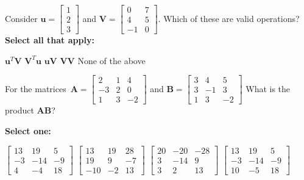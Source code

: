 \documentclass[11pt,addpoints,answers]{exam}
\numberwithin{equation}{section} %
\numberwithin{figure}{section} %
\numberwithin{table}{section} %
\newcommand{\uv}{\mathbf{u}}
\newcommand{\Vv}{\mathbf{V}}
\begin{document}
\begin{questions}
    \question[2] Consider $\uv = \begin{bmatrix} 1 \\ 2 \\ 3\end{bmatrix}$ and $\Vv = \begin{bmatrix} 0 & 7\\ 4 & 5\\ -1 & 0 \end{bmatrix}$. Which of these are valid operations? \\
    \textbf{Select all that apply:}
    
    \begin{checkboxes}
    {%
    \checkboxchar{$\Box$} \checkedchar{$\blacksquare$}
    
    \choice $\uv^T\Vv$
    \choice $\Vv^T\uv$
    \choice $\uv \Vv$
    \choice $\Vv \Vv$
    \choice None of the above
    }
    
    \end{checkboxes}
    
    
\clearpage

    \question[2] For the matrices $\mathbf{A}=\begin{bmatrix} 2 & 1 & 4 \\ -3 & 2 & 0 \\ 1 & 3 & -2 \end{bmatrix} $ and $\mathbf{B}=\begin{bmatrix} 3 & 4 & 5 \\ 3 & -1 & 3 \\ 1 & 3 & -2 \end{bmatrix}$
What is the product $\mathbf{AB}$?

    \textbf{Select one:}
    \begin{checkboxes}
        \choice $ \begin{bmatrix} 13 & 19 & 5 \\ -3 & -14 & -9 \\ 4 & -4 & 18 \end{bmatrix} $
        \choice $ \begin{bmatrix} 13 & 19 & 28 \\ 19 & 9 & -7 \\ -10 & -2 & 13 \end{bmatrix} $
        \choice $ \begin{bmatrix} 20 & -20 & -28 \\ 3 & -14 & 9 \\ 3 & 2 & 13 \end{bmatrix} $
        \choice $ \begin{bmatrix} 13 & 19 & 5 \\ -3 & -14 & -9 \\ 10 & -5 & 18 \end{bmatrix} $
    \end{checkboxes}



\end{questions}
\end{document}
